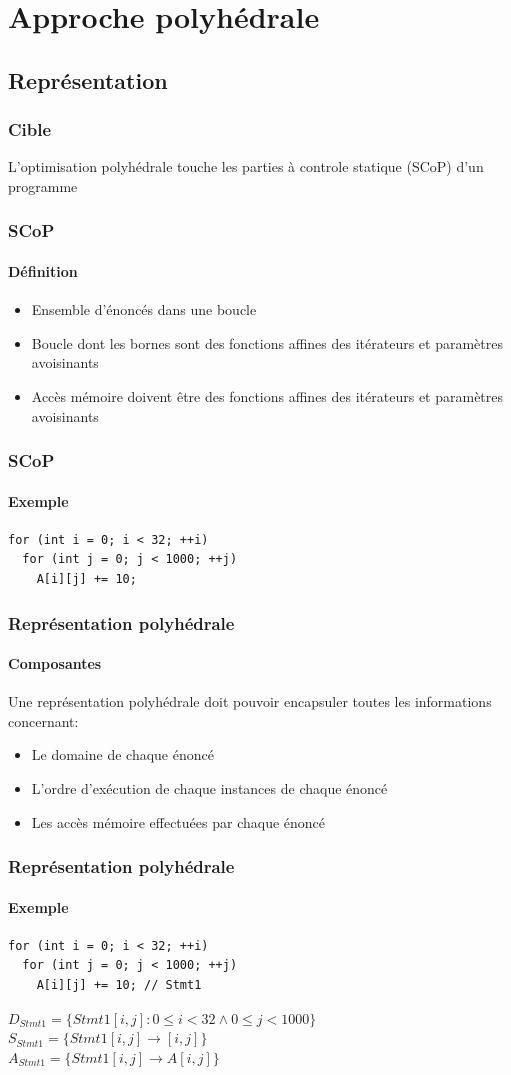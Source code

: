 \documentclass{beamer}
\begin{document}
\section{Approche polyhédrale}
\subsection{Représentation}
\begin{frame}
\frametitle{Cible}
L'optimisation polyhédrale touche les parties à controle statique (SCoP) d'un programme
\end{frame}

\begin{frame}
\frametitle{SCoP}
\framesubtitle{Définition}
\begin{itemize}
\item Ensemble d'énoncés dans une boucle
\item Boucle dont les bornes sont des fonctions affines des itérateurs et paramètres avoisinants
\item Accès mémoire doivent être des fonctions affines des itérateurs et paramètres avoisinants
\end{itemize}
\end{frame}

\begin{frame}[fragile]
\frametitle{SCoP}
\framesubtitle{Exemple}
\begin{lstlisting}
for (int i = 0; i < 32; ++i)
  for (int j = 0; j < 1000; ++j)
    A[i][j] += 10;
\end{lstlisting}
\end{frame}

\begin{frame}[fragile]
\frametitle{Représentation polyhédrale}
\framesubtitle{Composantes}
Une représentation polyhédrale doit pouvoir encapsuler toutes les informations concernant:
\begin{itemize}
\item Le domaine de chaque énoncé
\item L'ordre d'exécution de chaque instances de chaque énoncé
\item Les accès mémoire effectuées par chaque énoncé
\end{itemize}
\end{frame}

\begin{frame}[fragile]
\frametitle{Représentation polyhédrale}
\framesubtitle{Exemple}
\begin{lstlisting}
for (int i = 0; i < 32; ++i)
  for (int j = 0; j < 1000; ++j)
    A[i][j] += 10; // Stmt1
\end{lstlisting}
\vspace{0.75cm}
$D_{Stmt1} = \{Stmt1[i,j]: 0 \leq i < 32 \wedge 0 \leq j < 1000 \}$\\
$S_{Stmt1} = \{Stmt1[i,j] \rightarrow [i,j] \}$\\
$A_{Stmt1} = \{Stmt1[i,j] \rightarrow A[i,j] \}$\\
\end{frame}
\end{document}
